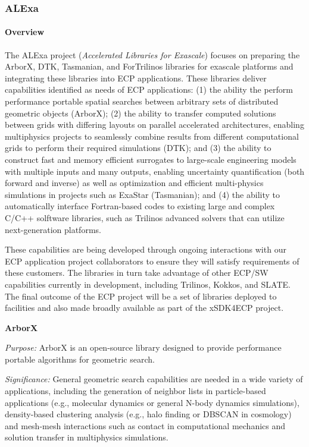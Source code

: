 \subsubsection{ ALExa}


\paragraph{Overview}

The ALExa project ({\sl Accelerated Libraries for Exascale}) focuses on
preparing the ArborX, DTK, Tasmanian, and ForTrilinos libraries for exascale
platforms and integrating these libraries into ECP applications.
These libraries deliver capabilities identified as needs of ECP applications:
%
(1) the ability the perform performance portable spatial searches between
arbitrary sets of distributed geometric objects (ArborX);
%
(2) the ability to transfer computed
solutions between grids with differing layouts on parallel accelerated
architectures, enabling multiphysics projects to seamlessly combine results
from different computational grids to perform their required simulations
(DTK); and
%
(3) the ability to construct fast and memory efficient surrogates to
large-scale engineering models with multiple inputs and many outputs,
enabling uncertainty quantification (both forward and inverse) as well as
optimization and efficient multi-physics simulations in projects such as
ExaStar (Tasmanian); and
%
(4) the ability to automatically interface Fortran-based codes to existing
large and complex C/C++ solftware libraries, such as Trilinos advanced solvers
that can utilize next-generation platforms.


These capabilities are being developed through ongoing interactions with our
ECP application project collaborators to ensure they will satisfy requirements
of these customers.  The libraries in turn take advantage of other ECP/SW
capabilities currently in development, including Trilinos,
Kokkos, and SLATE.  The final outcome of the ECP project will be a set of
libraries deployed to facilities and also made broadly available as part of
the xSDK4ECP project.


{\bf ArborX}

{\it Purpose:} ArborX is an open-source library designed to provide
performance portable algorithms for geometric search.

{\it Significance:} General geometric search capabilities are needed in a wide
variety of applications, including the generation of neighbor lists in
particle-based applications (e.g., molecular dynamics or general N-body
dynamics simulations), density-based clustering analysis (e.g., halo finding
or DBSCAN in cosmology) and mesh-mesh interactions such as contact in
computational mechanics and solution transfer in multiphysics simulations.

